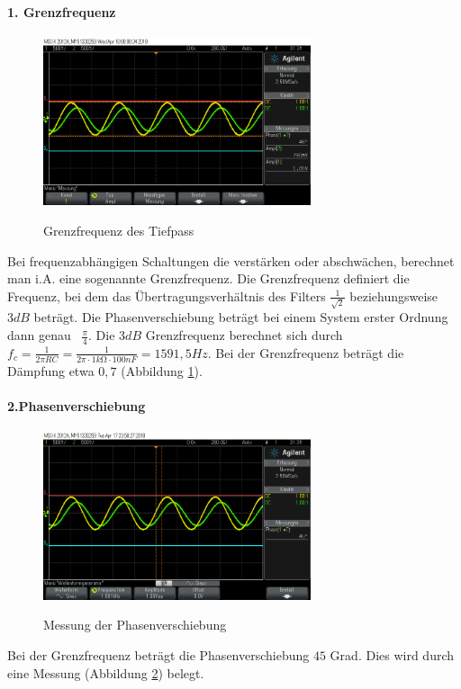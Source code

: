 \documentclass[a4paper]{article}
\begin{document}
    \paragraph{1. Grenzfrequenz}
    \begin{figure}
    \caption{Grenzfrequenz des Tiefpass}
    \centering
    \includegraphics[width=0.7\textwidth]{3db}
    \label{fig:3db}
    \end{figure}
    Bei frequenzabhängigen Schaltungen die verstärken oder abschwächen, berechnet man i.A. eine sogenannte Grenzfrequenz. Die Grenzfrequenz definiert die Frequenz, bei dem das Übertragungsverhältnis des Filters $\frac{1}{\sqrt{2}}$ beziehungsweise $3\si{dB}$ beträgt. Die Phasenverschiebung beträgt bei einem System erster Ordnung dann genau \ $\frac{\pi}{4}$. Die $3\si{dB}$ Grenzfrequenz berechnet sich durch $f_c=\frac{1}{2 \pi R C} = \frac{1}{2 \pi \cdot 1\si{k\ohm} \cdot 100\si{n F}} = 1591,5\si{Hz}$. Bei der Grenzfrequenz beträgt die Dämpfung etwa $0,7$ (Abbildung \ref{fig:3db}).
    
    \paragraph{2.Phasenverschiebung}
    \begin{figure}
    \caption{Messung der Phasenverschiebung}
    \centering
    \includegraphics[width=0.7\textwidth]{45deg}
    \label{fig:45deg}
    \end{figure}
    Bei der Grenzfrequenz beträgt die Phasenverschiebung $45$ Grad. Dies wird durch eine Messung (Abbildung \ref{fig:45deg}) belegt.
    
\end{document}
